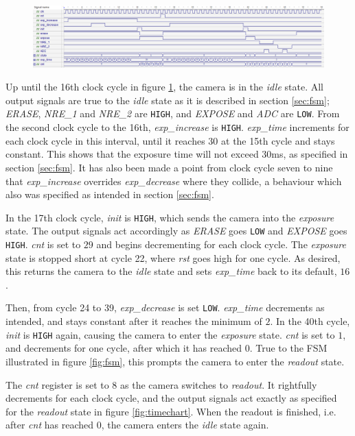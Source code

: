 \begin{figure}[H]
    \centering
    \includegraphics[width=\textwidth]{graphs/digital_waveform.png}
    \label{fig:waveform}
\end{figure}

Up until the 16th clock cycle in figure \ref{fig:waveform}, the camera is in the \emph{idle} state. All output signals are true to the \emph{idle} state as it is described in section \ref{sec:fsm}; \emph{ERASE}, \emph{NRE\_1} and \emph{NRE\_2} are \verb|HIGH|, and \emph{EXPOSE} and \emph{ADC} are \verb|LOW|. From the second clock cycle to the 16th, \emph{exp\_increase} is \verb|HIGH|. \emph{exp\_time} increments for each clock cycle in this interval, until it reaches $30$ at the 15th cycle and stays constant. This shows that the exposure time will not exceed $30$ms, as specified in section \ref{sec:fsm}. It has also been made a point from clock cycle seven to nine that \emph{exp\_increase} overrides \emph{exp\_decrease} where they collide, a behaviour which also was specified as intended in section \ref{sec:fsm}.

In the 17th clock cycle, \emph{init} is \verb|HIGH|, which sends the camera into the \emph{exposure} state. The output signals act accordingly as \emph{ERASE} goes \verb|LOW| and \emph{EXPOSE} goes \verb|HIGH|. \emph{cnt} is set to $29$ and begins decrementing for each clock cycle. The \emph{exposure} state is stopped short at cycle 22, where \emph{rst} goes high for one cycle. As desired, this returns the camera to the \emph{idle} state and sets \emph{exp\_time} back to its default, $16$.

Then, from cycle 24 to 39, \emph{exp\_decrease} is set \verb|LOW|. \emph{exp\_time} decrements as intended, and stays constant after it reaches the minimum of $2$. In the 40th cycle, \emph{init} is \verb|HIGH| again, causing the camera to enter the \emph{exposure} state. \emph{cnt} is set to $1$, and decrements for one cycle, after which it has reached $0$. True to the FSM illustrated in figure \ref{fig:fsm}, this prompts the camera to enter the \emph{readout} state.

The \emph{cnt} register is set to $8$ as the camera switches to \emph{readout}. It rightfully decrements for each clock cycle, and the output signals act exactly as specified for the \emph{readout} state in figure \ref{fig:timechart}. When the readout is finished, i.e. after \emph{cnt} has reached $0$, the camera enters the \emph{idle} state again.